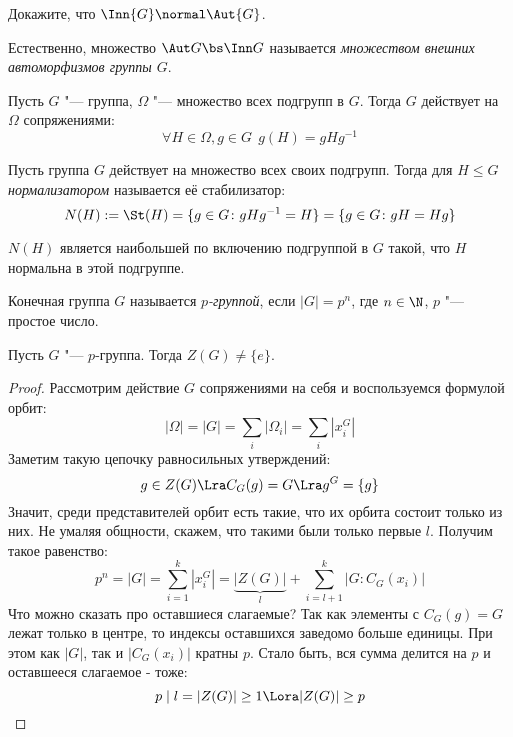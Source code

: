 \begin{exercise}
	Докажите, что $\Inn{G} \normal \Aut{G}$.
\end{exercise}

\begin{definition}
	Естественно, множество $\Aut G \bs \Inn G$ называется \textit{множеством внешних автоморфизмов группы $G$}.
\end{definition}

\begin{example}
	Пусть $G$ "--- группа, $\Omega$ "--- множество всех подгрупп в $G$. Тогда $G$ действует на $\Omega$ сопряжениями:
	\[
		\forall H \in \Omega, g \in G\ \ g(H) = gHg^{-1}
	\]
\end{example}

\begin{definition}
	Пусть группа $G$ действует на множество всех своих подгрупп. Тогда для $H \le G$ \textit{нормализатором} называется её стабилизатор:
	\[
		N(H) := \St(H) = \{g \in G \colon gHg^{-1} = H\} = \{g \in G \colon gH = Hg\}
	\]
\end{definition}

\begin{note}
	$N(H)$ является наибольшей по включению подгруппой в $G$ такой, что $H$ нормальна в этой подгруппе.
\end{note}

\begin{definition}
	Конечная группа $G$ называется \textit{$p$-группой}, если $|G| = p^n$, где $n \in \N$, $p$ "--- простое число.
\end{definition}

\begin{theorem}
	Пусть $G$ "--- $p$-группа. Тогда $Z(G) \ne \{e\}$.
\end{theorem}

\begin{proof}
	Рассмотрим действие $G$ сопряжениями на себя и воспользуемся формулой орбит:
	\[
		|\Omega| = |G| = \sum\limits_i |\Omega_i| = \sum\limits_i |x_i^G|
	\]
	Заметим такую цепочку равносильных утверждений:
	\[
		g \in Z(G) \Lra C_G(g) = G \Lra g^G = \{g\}
	\]
	Значит, среди представителей орбит есть такие, что их орбита состоит только из них. Не умаляя общности, скажем, что такими были только первые $l$. Получим такое равенство:
	\[
		p^n = |G| = \sum_{i = 1}^k |x_i^G| = \underbrace{|Z(G)|}_l + \sum_{i = l + 1}^k |G \colon C_G(x_i)|
	\]
	Что можно сказать про оставшиеся слагаемые? Так как элементы с $C_G(g) = G$ лежат только в центре, то индексы оставшихся заведомо больше единицы. При этом как $|G|$, так и $|C_G(x_i)|$ кратны $p$. Стало быть, вся сумма делится на $p$ и оставшееся слагаемое - тоже:
	\[
		p \mid l = |Z(G)| \ge 1 \Lora |Z(G)| \ge p
	\]
\end{proof}

